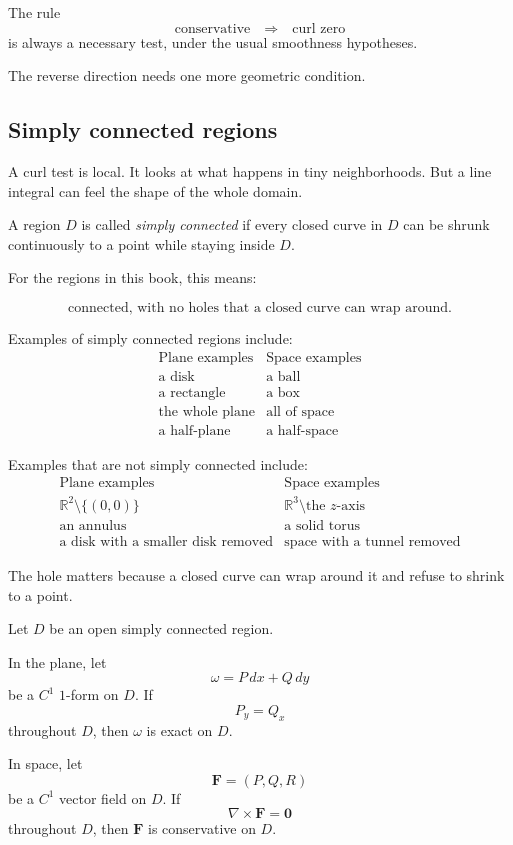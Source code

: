 The rule
\[
    \text{conservative} \quad\Longrightarrow\quad \text{curl zero}
\]
is always a necessary test, under the usual smoothness hypotheses.

The reverse direction needs one more geometric condition.

\subsection{Simply connected regions}

A curl test is local.  It looks at what happens in tiny neighborhoods.  But a line integral
can feel the shape of the whole domain.

A region \(D\) is called \emph{simply connected} if every closed curve in \(D\) can be
shrunk continuously to a point while staying inside \(D\).

For the regions in this book, this means:

\[
\boxed{
    \text{connected, with no holes that a closed curve can wrap around.}
}
\]

Examples of simply connected regions include:
\[
\begin{array}{c|c}
\text{Plane examples} & \text{Space examples} \\ \hline
\text{a disk} & \text{a ball}\\
\text{a rectangle} & \text{a box}\\
\text{the whole plane} & \text{all of space}\\
\text{a half-plane} & \text{a half-space}
\end{array}
\]

Examples that are not simply connected include:
\[
\begin{array}{c|c}
\text{Plane examples} & \text{Space examples} \\ \hline
\mathbb R^2\setminus\{(0,0)\} & \mathbb R^3\setminus\text{the }z\text{-axis}\\
\text{an annulus} & \text{a solid torus}\\
\text{a disk with a smaller disk removed} & \text{space with a tunnel removed}
\end{array}
\]

The hole matters because a closed curve can wrap around it and refuse to shrink to a
point.

\begin{theorem}
Let \(D\) be an open simply connected region.

In the plane, let
\[
    \omega=P\,dx+Q\,dy
\]
be a \(C^1\) \(1\)-form on \(D\).  If
\[
    P_y=Q_x
\]
throughout \(D\), then \(\omega\) is exact on \(D\).

In space, let
\[
    \mathbf F=(P,Q,R)
\]
be a \(C^1\) vector field on \(D\).  If
\[
    \nabla\times\mathbf F=\mathbf 0
\]
throughout \(D\), then \(\mathbf F\) is conservative on \(D\).
\end{theorem}

